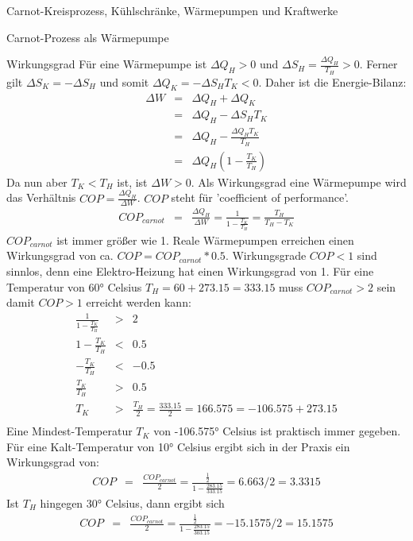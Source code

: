 \begin{chapter}{\titlestr}
\begin{section}{Carnot-Kreisprozess, Kühlschränke, Wärmepumpen und Kraftwerke}
\begin{subsection}{Carnot-Prozess als Wärmepumpe}
\begin{subsubsection}{Wirkungsgrad}
Für eine Wärmepumpe ist $\Delta Q_H>0$ und $\Delta S_H = \frac{\Delta Q_H}{T_H}>0$.
Ferner gilt $\Delta S_K=-\Delta S_H$ und somit $\Delta Q_K=-\Delta S_HT_K<0$.
Daher ist die Energie-Bilanz:
\begin{eqnarray*}
\Delta W &=& \Delta Q_H+\Delta Q_K\\
&=& \Delta Q_H-\Delta S_HT_K\\
&=& \Delta Q_H-\frac{\Delta Q_HT_K}{T_H}\\
&=& \Delta Q_H\left(1-\frac{T_K}{T_H}\right)
\end{eqnarray*}
Da nun aber $T_K<T_H$ ist, ist $\Delta W>0$. Als Wirkungsgrad eine Wärmepumpe wird das Verhältnis $COP=\frac{\Delta Q_H}{\Delta W}$.
$COP$ steht für 'coefficient of performance'.
\begin{eqnarray*}
COP_{carnot} &=& \frac{\Delta Q_H}{\Delta W} = \frac{1}{1-\frac{T_K}{T_H}}=\frac{T_H}{T_H-T_K}
\end{eqnarray*}
$COP_{carnot}$ ist immer größer wie 1. Reale Wärmepumpen erreichen einen Wirkungsgrad von ca. $COP=COP_{carnot}*0.5$.
Wirkungsgrade $COP<1$ sind sinnlos, denn eine Elektro-Heizung hat einen Wirkungsgrad von 1. Für eine Temperatur von 60° Celsius $T_H=60+273.15=333.15$
muss $COP_{carnot}>2$ sein damit $COP>1$ erreicht werden kann:
\begin{eqnarray*}
\frac{1}{1-\frac{T_K}{T_H}} &>& 2\\
1-\frac{T_K}{T_H} &<& 0.5\\
-\frac{T_K}{T_H} &<& -0.5\\
\frac{T_K}{T_H} &>& 0.5\\
T_K &>& \frac{T_H}{2}=\frac{333.15}{2}=166.575=-106.575+273.15\\
\end{eqnarray*}
Eine Mindest-Temperatur $T_K$ von -106.575° Celsius ist praktisch immer gegeben. Für eine Kalt-Temperatur von 10° Celsius ergibt sich in der Praxis
ein Wirkungsgrad von:
\begin{eqnarray*}
COP &=& \frac{COP_{carnot}}{2} = \frac{\frac{1}{2}}{1-\frac{283.15}{333.15}}=6.663/2=3.3315
\end{eqnarray*}
Ist $T_H$ hingegen 30° Celsius, dann ergibt sich
\begin{eqnarray*}
COP &=& \frac{COP_{carnot}}{2} = \frac{\frac{1}{2}}{1-\frac{283.15}{303.15}}=-15.1575/2=15.1575
\end{eqnarray*}
\end{subsubsection}


\end{subsection}
\end{section}
\end{chapter}
